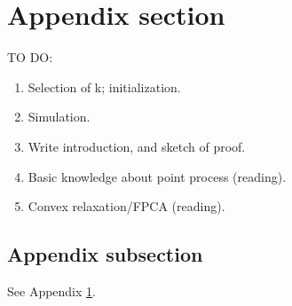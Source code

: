 
\appendix

\section{Appendix section}\label{app}

TO DO:
\begin{enumerate}
\item Selection of k; initialization.
\item Simulation.
\item Write introduction, and sketch of proof.
\item Basic knowledge about point process (reading).
\item Convex relaxation/FPCA (reading).
\end{enumerate}

\subsection{Appendix subsection}

See Appendix \ref{app}.
